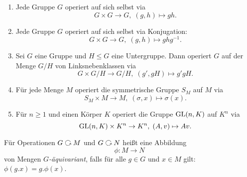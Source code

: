 \documentclass{book}
\begin{document}
\begin{exas}
    \label{exas:groupops}
    \begin{enumerate}
        \item Jede Gruppe $G$ operiert auf sich selbst via
            \[
                G \times G \to G, \; (g,h) \mapsto gh.
            \]
        \item {}Jede Gruppe $G$ operiert auf sich selbst via Konjugation:
            \[
                G \times G \to G, \; (g,h) \mapsto ghg^{-1}.
            \]
        \item {}Sei $G$ eine Gruppe und $H \le G$ eine Untergruppe. Dann operiert
            $G$ auf der Menge $G/H$ von Linksnebenklassen via
            \[
                G \times G/H \to G/H, \; (g', gH) \mapsto g'gH.
            \]
        \item {}Für jede Menge $M$ operiert die symmetrische Gruppe $S_M$ auf $M$ via
            \[
                S_M \times M \to M,\; (\sigma,x) \mapsto \sigma(x).
            \]
        \item Für $n \ge 1$ und einen Körper $K$ operiert die Gruppe $\operatorname{GL}(n,K)$ auf $K^n$ via
            \[
                \operatorname{GL}(n,K) \times K^n \to K^n,\; (A,v) \mapsto Av.
            \]
    \end{enumerate}
\end{exas}

\begin{defi}
    \label{defi:gehom}
    Für Operationen $G \actson M$ und $G \actson N$ heißt eine Abbildung
    \[
        \phi: M \to N
    \]
    von Mengen \emph{$G$-äquivariant}, falls für alle $g \in G$ und $x
    \in M$ gilt: $\phi(g.x) = g. \phi(x)$. 
\end{defi}
\end{document}
